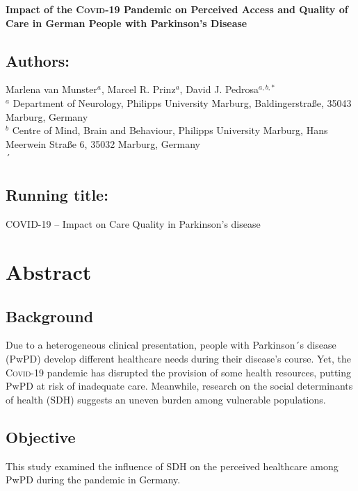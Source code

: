 \documentclass[a4paper,oneside,11pt,english]{scrartcl}
\begin{document}
	
\begin{titlepage}
	\noindent\Large{\textbf{Impact of the \textsc{Covid}-19 Pandemic on Perceived Access and Quality of Care in German People with Parkinson's Disease}}
	
	\subsection*{Authors:}
	Marlena van Munster$^{a}$, Marcel R. Prinz$^{a}$, David J. Pedrosa$^{a,b,*}$\\
		
	\noindent\small{$^{a}$ Department of Neurology, Philipps University Marburg, Baldingerstraße, 35043 Marburg, Germany}\\
	\small{$^{b}$ Centre of Mind, Brain and Behaviour, Philipps University Marburg, Hans Meerwein Straße 6, 35032 Marburg, Germany}\\

	´

	\vspace{2.5cm}
	\subsection*{Running title:}
	\textsc{COVID}-19 – Impact on Care Quality in Parkinson's disease\\
	
\end{titlepage}


\section*{Abstract}
\subsection*{Background}
Due to a heterogeneous clinical presentation, people with Parkinson´s disease (PwPD) develop different healthcare needs during their disease's course. Yet, the \textsc{Covid}-19 pandemic has disrupted the provision of some health resources, putting Pw\textsc{PD} at risk of inadequate care. Meanwhile, research on the social determinants of health (SDH) suggests an uneven burden among vulnerable populations.
\subsection*{Objective}
This study examined the influence of SDH on the perceived healthcare among PwPD during the pandemic in Germany.
\end{document}
